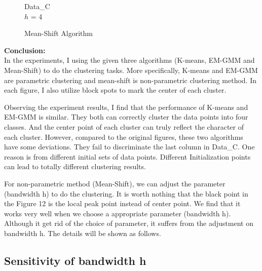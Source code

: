\documentclass[12pt]{article}
\begin{document}
\begin{figure}[H]
	  \caption{Data\_C \\$h$ = 4}\label{fig:kmeans-c}
	\endminipage
	\caption{Mean-Shift Algorithm}
\end{figure}

\textbf{Conclusion:}\\

In the experiments, I using the given three algorithms (K-means, EM-GMM and Mean-Shift) to do the clustering tasks. More specifically, K-means and EM-GMM are parametric clustering and mean-shift is non-parametric clustering method. In each figure, I also utilize block spots to mark the center of each cluster. 

Observing the experiment results, I find that the performance of K-means and EM-GMM is similar. They both can correctly cluster the data points into four classes. And the center point of each cluster can truly reflect the character of each cluster. However, compared to the original figures, these two algorithms have some deviations. They fail to discriminate the last column in Data\_C. One reason is from different initial sets of data points. Different Initialization points can lead to totally different clustering results.

For non-parametric method (Mean-Shift), we can adjust the parameter (bandwidth h) to do the clustering. It is worth nothing that the black point in the Figure 12 is the local peak point instead of center point. We find that it works very well when we choose a appropriate parameter (bandwidth h). Although it get rid of the choice of parameter, it suffers from the adjustment on bandwidth h. The details will be shown as follows.

\subsection{Sensitivity of bandwidth h}
\end{document}
